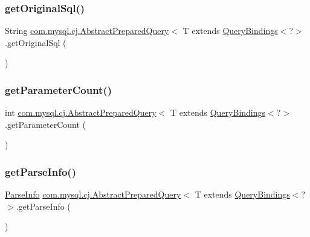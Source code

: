 \subsubsection{\texorpdfstring{get\+Original\+Sql()}{getOriginalSql()}}
{\footnotesize\ttfamily String \mbox{\hyperlink{classcom_1_1mysql_1_1cj_1_1_abstract_prepared_query}{com.\+mysql.\+cj.\+Abstract\+Prepared\+Query}}$<$ T extends \mbox{\hyperlink{interfacecom_1_1mysql_1_1cj_1_1_query_bindings}{Query\+Bindings}}$<$?$>$.get\+Original\+Sql (\begin{DoxyParamCaption}{ }\end{DoxyParamCaption})}

\mbox{\label{classcom_1_1mysql_1_1cj_1_1_abstract_prepared_query_a34bab98739dae5cf2c464c66299cbfe5}} 
\subsubsection{\texorpdfstring{get\+Parameter\+Count()}{getParameterCount()}}
{\footnotesize\ttfamily int \mbox{\hyperlink{classcom_1_1mysql_1_1cj_1_1_abstract_prepared_query}{com.\+mysql.\+cj.\+Abstract\+Prepared\+Query}}$<$ T extends \mbox{\hyperlink{interfacecom_1_1mysql_1_1cj_1_1_query_bindings}{Query\+Bindings}}$<$?$>$.get\+Parameter\+Count (\begin{DoxyParamCaption}{ }\end{DoxyParamCaption})}

\mbox{\label{classcom_1_1mysql_1_1cj_1_1_abstract_prepared_query_a4dff15e2c2238c5bcc5b383306828163}} 
\subsubsection{\texorpdfstring{get\+Parse\+Info()}{getParseInfo()}}
{\footnotesize\ttfamily \mbox{\hyperlink{classcom_1_1mysql_1_1cj_1_1_parse_info}{Parse\+Info}} \mbox{\hyperlink{classcom_1_1mysql_1_1cj_1_1_abstract_prepared_query}{com.\+mysql.\+cj.\+Abstract\+Prepared\+Query}}$<$ T extends \mbox{\hyperlink{interfacecom_1_1mysql_1_1cj_1_1_query_bindings}{Query\+Bindings}}$<$?$>$.get\+Parse\+Info (\begin{DoxyParamCaption}{ }\end{DoxyParamCaption})}

